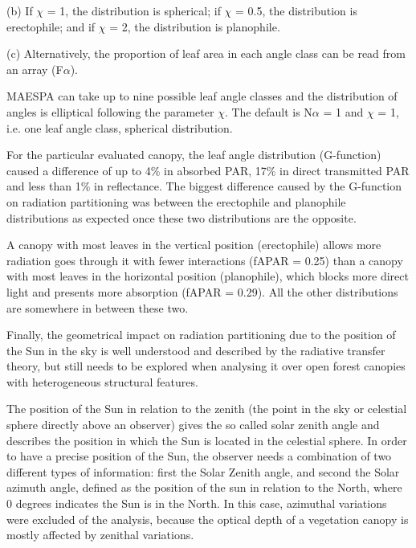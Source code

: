 (b) If $\chi$ = 1, the distribution is spherical; if $\chi$ = 0.5, the distribution is erectophile; and if $\chi$ = 2, the distribution is planophile. 

(c) Alternatively, the proportion of leaf area in each angle class can be read from an array (F$\alpha$). 

MAESPA can take up to nine possible leaf angle classes and the distribution of angles is elliptical following the parameter $\chi$. The default is N$\alpha$ = 1 and $\chi$ = 1, i.e. one leaf angle class, spherical distribution. 

For the particular evaluated canopy, the leaf angle distribution (G-function) caused a difference of up to 4\% in absorbed PAR, 17\% in direct transmitted PAR and less than 1\% in reflectance. The biggest difference caused by the G-function on radiation partitioning was between the erectophile and planophile distributions as expected once these two distributions are the opposite. 

A canopy with most leaves in the vertical position (erectophile) allows more radiation goes through it with fewer interactions (fAPAR = 0.25) than a canopy with most leaves in the horizontal position (planophile), which blocks more direct light and presents more absorption (fAPAR = 0.29). All the other distributions are somewhere in between these two. 

Finally, the geometrical impact on radiation partitioning due to the position of the Sun in the sky is well understood  and described by the radiative transfer theory, but still needs to be explored when analysing it over open forest canopies with heterogeneous structural features.

The position of the Sun in relation to the zenith (the point in the sky or celestial sphere directly above an observer) gives the so called solar zenith angle and describes the position in which the Sun is located in the celestial sphere. In order to have a precise position of the Sun, the observer needs a combination of two different types of information: first the Solar Zenith angle, and second the Solar azimuth angle, defined as the position of the sun in relation to the North, where 0 degrees indicates the Sun is in the North. In this case, azimuthal variations were excluded of the analysis, because the optical depth of a vegetation canopy is mostly affected by zenithal variations. 

